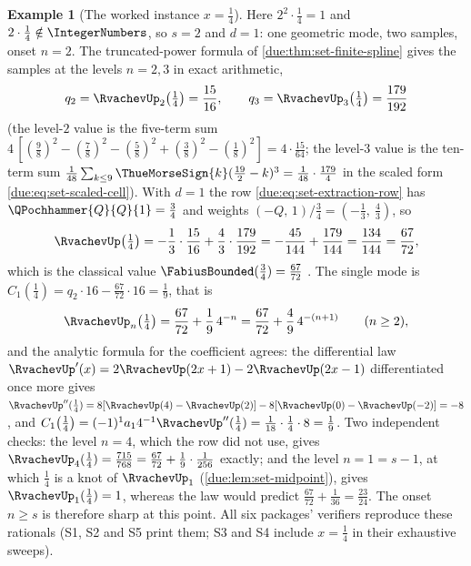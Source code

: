 \documentclass[11pt,oneside]{article}
\theoremstyle{plain}
\theoremstyle{definition}
\newtheorem{example}[theorem]{Example}
\theoremstyle{remark}
\newcommand{\upn}[1]{\RvachevUp_{#1}}
\newcommand{\Qq}{Q}                                         %
\newcommand{\am}[1]{a_{#1}}                                 %
\newcommand{\Cr}[2]{C_{#1}\!\left(#2\right)}                %
\newcommand{\qn}[1]{q_{#1}}                                 %
\begin{document}
\begin{example}[The worked instance $x=\frac14$]
\label{due:ex:set-quarter}
Here $2^{2}\cdot\frac14=1$ and $2\cdot\frac14\notin\IntegerNumbers$, so
$s=2$ and $d=1$: one geometric mode, two samples, onset $n=2$.  The
truncated-power formula of \cref{due:thm:set-finite-spline} gives the
samples at the levels $n=2,3$ in exact arithmetic,
\[
 \qn{2}=\upn{2}\!\left(\tfrac14\right)=\frac{15}{16},
 \qquad
 \qn{3}=\upn{3}\!\left(\tfrac14\right)=\frac{179}{192}
\]
(the level-$2$ value is the five-term sum
$4\,[(\tfrac98)^2-(\tfrac78)^2-(\tfrac58)^2+(\tfrac38)^2-(\tfrac18)^2]
=4\cdot\tfrac{15}{64}$; the level-$3$ value is the ten-term sum
$\tfrac1{48}\sum_{k\le9}\ThueMorseSign{k}(\tfrac{19}{2}-k)^{3}
=\tfrac1{48}\cdot\tfrac{179}{4}$ in the scaled form
\cref{due:eq:set-scaled-cell}).  With $d=1$ the row
\cref{due:eq:set-extraction-row} has $\QPochhammer{\Qq}{\Qq}{1}=\frac34$
and weights $(-\Qq,\,1)/\frac34=\left(-\tfrac13,\ \tfrac43\right)$, so
\[
 \RvachevUp\!\left(\tfrac14\right)
 =-\frac13\cdot\frac{15}{16}+\frac43\cdot\frac{179}{192}
 =-\frac{45}{144}+\frac{179}{144}
 =\frac{134}{144}
 =\frac{67}{72},
\]
which is the classical value $\FabiusBounded(\tfrac34)=\tfrac{67}{72}$
\cite{haugland2016,arias2018}.  The single mode is
$\Cr{1}{\frac14}=\qn{2}\cdot16-\tfrac{67}{72}\cdot16=\tfrac19$, that is
\[
 \upn{n}\!\left(\tfrac14\right)=\frac{67}{72}+\frac19\,4^{-n}
 =\frac{67}{72}+\frac49\,4^{-(n+1)}
 \qquad(n\ge2),
\]
and the analytic formula for the coefficient agrees: the differential law
$\RvachevUp'(x)=2\RvachevUp(2x+1)-2\RvachevUp(2x-1)$ differentiated once
more gives
$\RvachevUp''(\tfrac14)=8[\RvachevUp(4)-\RvachevUp(2)]
-8[\RvachevUp(0)-\RvachevUp(-2)]=-8$, and
$\Cr{1}{\frac14}=(-1)^{1}\am{1}4^{-1}\RvachevUp''(\tfrac14)
=\tfrac1{18}\cdot\tfrac14\cdot8=\tfrac19$.  Two independent checks: the
level $n=4$, which the row did not use, gives
$\upn{4}(\tfrac14)=\tfrac{715}{768}=\tfrac{67}{72}+\tfrac19\cdot\tfrac1{256}$
exactly; and the level $n=1=s-1$, at which $\frac14$ is a knot of
$\upn{1}$ (\cref{due:lem:set-midpoint}), gives $\upn{1}(\tfrac14)=1$,
whereas the law would predict $\tfrac{67}{72}+\tfrac1{36}=\tfrac{23}{24}$.
The onset $n\ge s$ is therefore sharp at this point.  All six packages'
verifiers reproduce these rationals (S1, S2 and S5 print them; S3 and S4
include $x=\frac14$ in their exhaustive sweeps).
\end{example}
\end{document}
